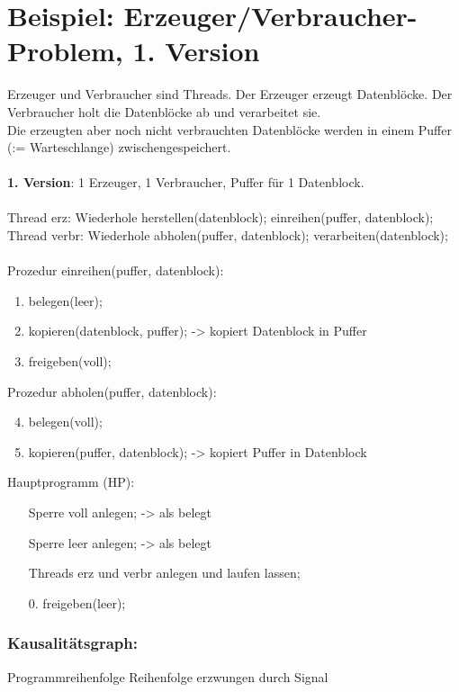 \section[Beispiel: Erzeuger/Verbraucher (1)]{Beispiel: Erzeuger/Verbraucher-Problem, 1. Version}
Erzeuger und Verbraucher sind Threads. Der Erzeuger erzeugt Datenblöcke. Der Verbraucher holt die Datenblöcke ab und verarbeitet sie.\\
Die erzeugten aber noch nicht verbrauchten Datenblöcke werden in einem Puffer (:= Warteschlange) zwischengespeichert.\\
\\
\textbf{1. Version}: 1 Erzeuger, 1 Verbraucher, Puffer für 1 Datenblock.\\
\\ %
Thread erz:
	Wiederhole
		herstellen(datenblock);
		einreihen(puffer, datenblock);
Thread verbr:
	Wiederhole
		abholen(puffer, datenblock);
		verarbeiten(datenblock);\\
\\
Prozedur einreihen(puffer, datenblock):
\begin{enumerate}
	\item belegen(leer);
	\item kopieren(datenblock, puffer); -> kopiert Datenblock in Puffer
	\item freigeben(voll);
\end{enumerate}
Prozedur abholen(puffer, datenblock):
\begin{enumerate}
	\setcounter{enumi}{3}
	\item belegen(voll);
	\item kopieren(puffer, datenblock); -> kopiert Puffer in Datenblock
\end{enumerate}
Hauptprogramm (HP):
\begin{enumerate}
	\item[] Sperre voll anlegen; -> als belegt
	\item[] Sperre leer anlegen; -> als belegt
	\item[] Threads erz und verbr anlegen und laufen lassen;
	\item[0.] freigeben(leer);
\end{enumerate}

\subsubsection*{Kausalitätsgraph:} %

Programmreihenfolge
Reihenfolge erzwungen durch Signal

